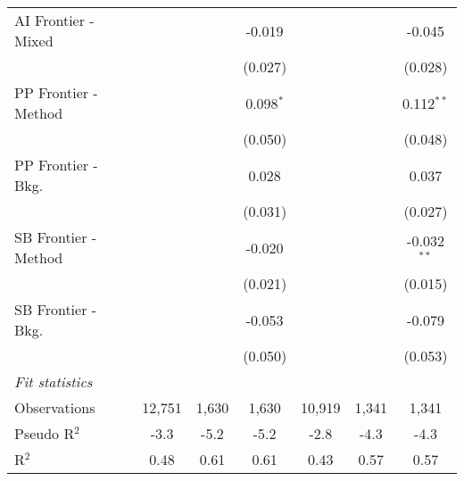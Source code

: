 \begin{tabular}{lcccccc}
   AI Frontier - Mixed  &             &         & -0.019      &              &              & -0.045\\   
                        &             &         & (0.027)     &              &              & (0.028)\\   
   PP Frontier - Method &             &         & 0.098$^{*}$ &              &              & 0.112$^{**}$\\   
                        &             &         & (0.050)     &              &              & (0.048)\\   
   PP Frontier - Bkg.   &             &         & 0.028       &              &              & 0.037\\   
                        &             &         & (0.031)     &              &              & (0.027)\\   
   SB Frontier - Method &             &         & -0.020      &              &              & -0.032$^{**}$\\   
                        &             &         & (0.021)     &              &              & (0.015)\\   
   SB Frontier - Bkg.   &             &         & -0.053      &              &              & -0.079\\   
                        &             &         & (0.050)     &              &              & (0.053)\\   
   \midrule
   \emph{Fit statistics}\\
   Observations         & 12,751      & 1,630   & 1,630       & 10,919       & 1,341        & 1,341\\  
   Pseudo R$^2$         & -3.3        & -5.2    & -5.2        & -2.8         & -4.3         & -4.3\\  
   R$^2$                & 0.48        & 0.61    & 0.61        & 0.43         & 0.57         & 0.57\\  
   

\end{tabular}
